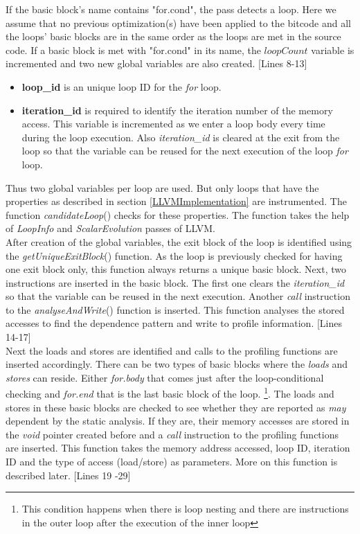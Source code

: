 \documentclass[10pt]{report}          %
\begin{document}
If the basic block's name contains "for.cond", the pass detects a loop.  Here we assume that no previous optimization(s) have been applied to the bitcode and all the loops' basic blocks are in the same order as the loops are met in the source code.  If a basic block is met with "for.cond" in its name, the $loopCount$ variable is incremented and two new global variables are also created. [Lines 8-13]

\begin{itemize}

\item \textbf{loop\_id} is an unique loop ID for the \textit{for} loop.
\item \textbf{iteration\_id} is required to identify the iteration number of the memory access.  This variable is incremented as we enter a loop body every time during the loop execution.  Also \textit{iteration\_id} is cleared at the exit from the loop so that the variable can be reused for the next execution of the loop \textit{for} loop.

\end{itemize}

Thus two global variables per loop are used. But only loops that have the properties as described in section \ref{LLVMImplementation} are instrumented.  The function \textit{candidateLoop}() checks for these properties.  The function takes the help of \textit{LoopInfo} and \textit{ScalarEvolution} passes of LLVM. \\

After creation of the global variables, the exit block of the loop is identified using the \textit{getUniqueExitBlock}() function.  As the loop is previously checked for having one exit block only, this function always returns a unique basic block.  Next, two instructions are inserted in the basic block.  The first one clears the \textit{iteration\_id} so that the variable can be reused in the next execution.  Another \textit{call} instruction  to the \textit{analyseAndWrite}() function is inserted. This function analyses the stored accesses to find the dependence pattern and write to profile  information. [Lines 14-17] \\

Next the loads and stores are identified and calls to the profiling functions are inserted accordingly.  There can be two types of basic blocks where the \textit{loads} and \textit{stores} can reside.  Either \textit{for.body} that comes just after the loop-conditional checking and \textit{for.end} that is the last basic block of the loop. \footnote{This condition happens when there is loop nesting and there are instructions in the outer loop after the execution of the inner loop}.  The loads and stores in these basic blocks are checked to see whether they are reported as \textit{may} dependent by the static analysis.  If they are, their memory accesses are stored in the \textit{void} pointer created before and a \textit{call} instruction to the profiling functions are inserted.  This function takes the memory address accessed, loop ID, iteration ID and the type of access (load/store) as parameters. More on this function is described later. [Lines 19 -29] \\
\end{document}
